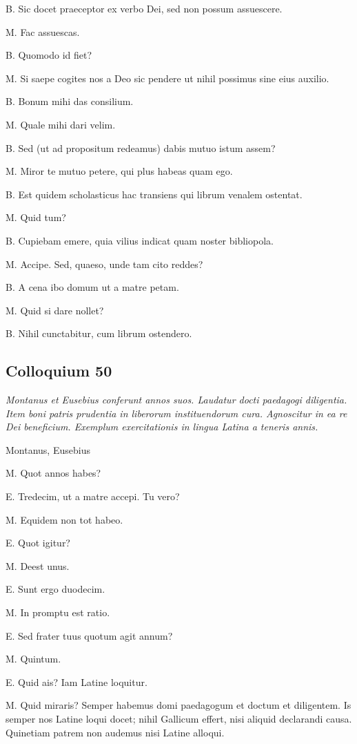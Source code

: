 \documentclass{article}
\begin{document}
B. Sic docet praeceptor ex verbo Dei, sed non possum assuescere. 

M. Fac assuescas. 

B. Quomodo id fiet?

M. Si saepe cogites nos a Deo sic pendere ut nihil possimus sine eius auxilio. 

B. Bonum mihi das consilium. 

M. Quale mihi dari velim. 

B. Sed (ut ad propositum redeamus) dabis mutuo istum assem?

M. Miror te mutuo petere, qui plus habeas quam ego. 

B. Est quidem scholasticus hac transiens qui librum venalem ostentat. 

M. Quid tum?

B. Cupiebam emere, quia vilius indicat quam noster bibliopola. 

M. Accipe. Sed, quaeso, unde tam cito reddes?

B. A cena ibo domum ut a matre petam. 

M. Quid si dare nollet?

B. Nihil cunctabitur, cum librum ostendero.

\subsection{Colloquium 50}
\emph{Montanus et Eusebius conferunt annos suos. Laudatur docti paedagogi diligentia. Item boni patris prudentia in liberorum instituendorum cura. Agnoscitur in ea re Dei beneficium. Exemplum exercitationis in lingua Latina a teneris annis.}

Montanus, Eusebius

M. Quot annos habes?

E. Tredecim, ut a matre accepi. Tu vero?

M. Equidem non tot habeo. 

E. Quot igitur?

M. Deest unus. 

E. Sunt ergo duodecim. 

M. In promptu est ratio. 

E. Sed frater tuus quotum agit annum?

M. Quintum. 

E. Quid ais? Iam Latine loquitur. 

M. Quid miraris? Semper habemus domi paedagogum et doctum et diligentem. Is semper nos Latine loqui docet; nihil Gallicum effert, nisi aliquid declarandi causa. Quinetiam patrem non audemus nisi Latine alloqui.
\end{document}
